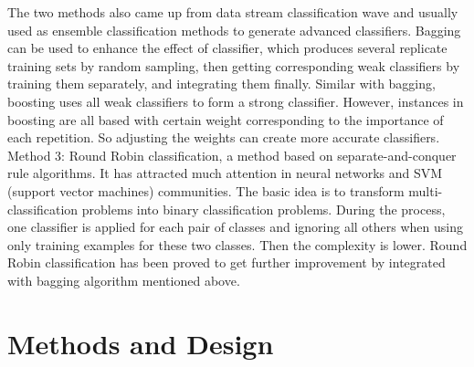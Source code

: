 \documentclass[12pt]{report}
\begin{document}
\newline The two methods also came up from data stream classification wave and usually used as ensemble classification methods to generate advanced classifiers. 
\newline Bagging can be used to enhance the effect of classifier, which produces several replicate training sets by random sampling, then getting corresponding weak classifiers by training them separately, and integrating them finally.
\newline Similar with bagging, boosting uses all weak classifiers to form a strong classifier. However, instances in boosting are all based with certain weight corresponding to the importance of each repetition. So adjusting the weights can create more accurate classifiers.
\newline
\newline
Method 3: Round Robin classification, a method based on separate-and-conquer rule algorithms.
\newline It has attracted much attention in neural networks and SVM (support vector machines) communities. The basic idea is to transform multi-classification problems into binary classification problems. During the process, one classifier is applied for each pair of classes and ignoring all others when using only training examples for these two classes. Then the complexity is lower. Round Robin classification has been proved to get further improvement by integrated with bagging algorithm mentioned above.

\section*{Methods and Design}
\end{document}
